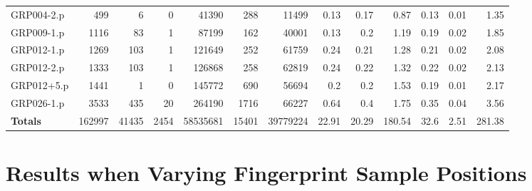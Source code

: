 \begin{table}[H]
\begin{adjustwidth}{-0.4in}{-0.5in}
\begin{tabular}{| l || r | r | r || r | r | r || r | r | r | r | r | r |}
GRP004-2.p&499&6&0&41390&288&11499&0.13&0.17&0.87&0.13&0.01&1.35\\
GRP009-1.p&1116&83&1&87199&162&40001&0.13&0.2&1.19&0.19&0.02&1.85\\
GRP012-1.p&1269&103&1&121649&252&61759&0.24&0.21&1.28&0.21&0.02&2.08\\
GRP012-2.p&1333&103&1&126868&258&62819&0.24&0.22&1.32&0.22&0.02&2.13\\
GRP012+5.p&1441&1&0&145772&690&56694&0.2&0.2&1.53&0.19&0.01&2.17\\
GRP026-1.p&3533&435&20&264190&1716&66227&0.64&0.4&1.75&0.35&0.04&3.56\\ \hline \hline
\textbf{Totals}&162997&41435&2454&58535681&15401&39779224&22.91&20.29&180.54&32.6&2.51&281.38 \\ \hline
\end{tabular}\end{adjustwidth}\end{table}


\chapter{Results when Varying Fingerprint Sample Positions}
\label{app:app2}

